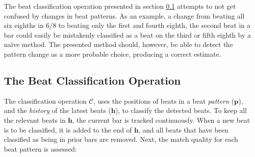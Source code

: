 The beat classification operation presented
in section \ref{sec:beat_classification_op}
attempts to not get confused by changes in beat patterns.
As an example, a change from beating all six eighths in 6/8
to beating only the first and fourth eighth,
the second beat in a bar could easily be mistakenly classified
as a beat on the third or fifth eighth
by a na\"ive method.
The presented method should, however,
be able to detect the pattern change as
a more probable choice,
producing a correct estimate.

\subsection{The Beat Classification Operation}
\label{sec:beat_classification_op}

The classification operation $\mathcal{C}$,
uses the positions of beats in a beat \textit{pattern} ($\mathbf{p}$),
and the \textit{history} of the latest beats ($\mathbf{h}$),
to classify the detected beats.
To keep all the relevant beats in $\mathbf{h}$,
the current bar is tracked continuously.
When a new beat is to be classified,
it is added to the end of $\mathbf{h}$,
and all beats that have been classified
as being in prior bars are removed.
Next, the match quality for each beat pattern is assessed:
